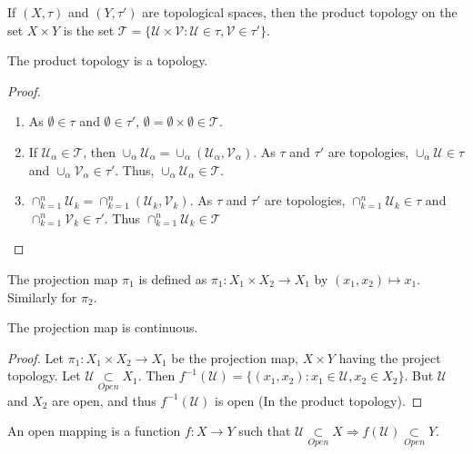         \begin{definition}
        If $(X,\tau)$ and $(Y,\tau')$ are topological spaces, then the product topology on the set $X\times Y$ is the set $\mathscr{T} = \{\mathcal{U}\times \mathcal{V}:\mathcal{U}\in\tau,\mathcal{V}\in \tau'\}$.
        \end{definition}
        \begin{theorem}
        The product topology is a topology.
        \end{theorem}
        \begin{proof}
        \
        \begin{enumerate}
        \item As $\emptyset \in \tau$ and $\emptyset\in \tau'$, $\emptyset =\emptyset\times \emptyset \in \mathscr{T}$.
        \item If $\mathscr{U}_{\alpha}\in \mathscr{T}$, then $\cup_{\alpha} \mathscr{U}_{\alpha} = \cup_{\alpha} (\mathcal{U}_{\alpha},\mathcal{V}_{\alpha})$. As $\tau$ and $\tau'$ are topologies, $\cup_{\alpha} \mathcal{U} \in \tau$ and $\cup_{\alpha}\mathcal{V}_{\alpha} \in \tau'$. Thus, $\cup_{\alpha}\mathscr{U}_{\alpha} \in \mathscr{T}$.
        \item $\cap_{k=1}^{n} \mathscr{U}_{k} = \cap_{k=1}^{n} (\mathcal{U}_k,\mathcal{V}_k)$. As $\tau$ and $\tau'$ are topologies, $\cap_{k=1}^{n}\mathcal{U}_k \in \tau$ and $\cap_{k=1}^{n}\mathcal{V}_{k} \in \tau'$. Thus $\cap_{k=1}^{n} \mathscr{U}_k \in \mathscr{T}$
        \end{enumerate}
        \end{proof}
        \begin{definition}
        The projection map $\pi_1$ is defined as $\pi_1:X_1\times X_2\rightarrow X_1$ by $(x_1,x_2)\mapsto x_1$. Similarly for $\pi_2$.
        \end{definition}
        \begin{theorem}
        The projection map is continuous.
        \end{theorem}
        \begin{proof}
        Let $\pi_1:X_1\times X_2\rightarrow X_1$ be the projection map, $X\times Y$ having the project topology. Let $\mathcal{U}\underset{Open}\subset X_1$. Then $f^{-1}(\mathcal{U}) = \{(x_1,x_2):x_1\in \mathcal{U}, x_2\in X_2\}$. But $\mathcal{U}$ and $X_2$ are open, and thus $f^{-1}(\mathcal{U})$ is open (In the product topology).
        \end{proof}
        \begin{definition}
        An open mapping is a function $f:X\rightarrow Y$ such that $\mathcal{U}\underset{Open}\subset X\Rightarrow f(\mathcal{U}) \underset{Open}\subset Y$.
        \end{definition}
